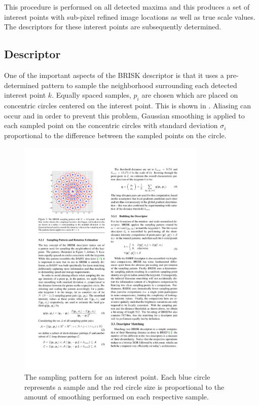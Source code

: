 \documentclass{report}
\begin{document}
This procedure is performed on all detected maxima and this produces a set of interest points with sub-pixel refined image locations as well as true scale values. The descriptors for these interest points are subsequently determined.

\subsection{Descriptor}
\label{sec:briskDescribe}
One of the important aspects of the BRISK descriptor is that it uses a pre-determined pattern to sample the neighborhood surrounding each detected interest point $k$. Equally spaced samples, $p_i$ are chosen which are placed on concentric circles centered on the interest point. This is shown in  \cite{Leutenegger2011}. Aliasing can occur and in order to prevent this problem, Gaussian smoothing is applied to each sampled point on the concentric circles with standard deviation $\sigma_i$ proportional to the difference between the sampled points on the circle. \\

\begin{figure}[h!] 
  \centering
    \includegraphics[width=0.8\textwidth]{../Drawings/methods/BRISK_Sampling_Pattern.pdf}
    \caption{The sampling pattern for an interest point. Each blue circle represents a sample and the red circle size is proportional to the amount of smoothing performed on each respective sample.}
    \label{fig:samplingPattern}
\end{figure}
\end{document}
